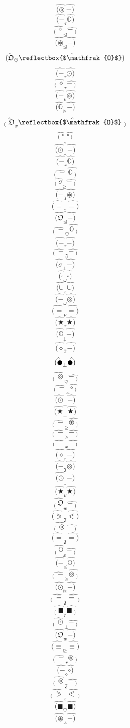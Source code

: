 \documentclass[12pt]{article}
\begin{document}
\begin{multicols}{5}
$$\hat{(\circledcirc} \  \hat{-)}$$
$$\hat{(-} _\tau \hat{\mathbb{O})}$$
$$\hat{_( \ \diamond} _\trianglelefteq \hat{-\ _)}$$
$$\hat{(\circledast} _\trianglelefteq \hat{-)}$$
$$\hat{(\mathfrak{O}} _\heartsuit \hat{\reflectbox{$\mathfrak{O}$})}$$
$$\hat{(-} _\tau \hat{\odot)}$$
$$\hat{_( \ \diamond} _\tau \hat{-\ _)}$$
$$\hat{(-} _\nu \hat{\circledcirc)}$$
$$\hat{(\mathbb{O}} _\trianglerighteq \hat{-)}$$
$$\hat{_( \ \mathfrak{O}} _x \hat{\reflectbox{$\mathfrak{O}$}\ _)}$$
$$\hat{_( \ \square} _\downarrow \hat{\square\ _)}$$
$$\hat{(\odot} _\curlywedge \hat{-)}$$
$$\hat{(-} _r \hat{\mathbb{O})}$$
$$\hat{_( \ -} \  \hat{\mathbb{O}\ _)}$$
$$\hat{_( \ \sigma} _\trianglerighteq \hat{-\ _)}$$
$$\hat{(-} _\mathfrak{I} \hat{\circledast)}$$
$$\hat{(=} _x \hat{=)}$$
$$\hat{(\mathfrak{O}} _\trianglelefteq \hat{-)}$$
$$\hat{_( \ -} _\heartsuit \hat{\mathbb{O}\ _)}$$
$$\hat{(-} _\tau \hat{-)}$$
$$\hat{_( \ -} _\mathfrak{J} \hat{-\ _)}$$
$$\hat{(\sigma} _\bot \hat{-)}$$
$$\hat{(\square} _\omega \hat{\square)}$$
$$\hat{(\cup} _x \hat{\cup)}$$
$$\hat{(-} _\omega \hat{\circledcirc)}$$
$$\hat{(=} _\nu \hat{=)}$$
$$\hat{(\bigstar} _\tau \hat{\bigstar)}$$
$$\hat{(\mathbb{O}} _\downarrow \hat{-)}$$
$$\hat{(\diamond} _\mathfrak{I} \hat{-)}$$
$$\hat{(\newmoon} _\bot \hat{\newmoon)}$$
$$\hat{_( \ \circledcirc} _\heartsuit \hat{-\ _)}$$
$$\hat{_( \ -} _\curlywedge \hat{\circ\ _)}$$
$$\hat{(\odot} _\bot \hat{-)}$$
$$\hat{(\bigstar} _\bot \hat{\bigstar)}$$
$$\hat{_( \ -} _\trianglerighteq \hat{\circledast\ _)}$$
$$\hat{_( \ -} _\trianglerighteq \hat{-\ _)}$$
$$\hat{_( \ -} _x \hat{-\ _)}$$
$$\hat{(\diamond} _r \hat{-)}$$
$$\hat{(-} _\mathfrak{I} \hat{\circledcirc)}$$
$$\hat{(\odot} _\downarrow \hat{-)}$$
$$\hat{(\bigstar} _\nu \hat{\bigstar)}$$
$$\hat{_( \ \mathfrak{O}} _w \hat{-\ _)}$$
$$\hat{(\eqslantgtr} _\mathfrak{I} \hat{\eqslantless)}$$
$$\hat{_( \ \circledcirc} \  \hat{-\ _)}$$
$$\hat{(=} _\mathfrak{J} \hat{=)}$$
$$\hat{_( \ \mathbb{O}} _x \hat{-\ _)}$$
$$\hat{(-} _\trianglelefteq \hat{\mathbb{O})}$$
$$\hat{_( \ -} _\trianglerighteq \hat{\circledcirc\ _)}$$
$$\hat{(\odot} _\trianglerighteq \hat{-)}$$
$$\hat{_( \ \equiv} _\mathfrak{J} \hat{\equiv\ _)}$$
$$\hat{_( \ \blacksquare} _r \hat{\blacksquare\ _)}$$
$$\hat{_( \ \odot} _\bot \hat{-\ _)}$$
$$\hat{(\mathfrak{O}} _w \hat{-)}$$
$$\hat{(\equiv} _\trianglerighteq \hat{\equiv)}$$
$$\hat{_( \ -} _r \hat{\circledast\ _)}$$
$$\hat{(-} _\diamond \hat{\circ)}$$
$$\hat{_( \ \circledast} _\mathfrak{J} \hat{-\ _)}$$
$$\hat{_( \ \eqslantgtr} _x \hat{\eqslantless\ _)}$$
$$\hat{(\blacksquare} _\heartsuit \hat{\blacksquare)}$$
$$\hat{(\circledast} _\curlywedge \hat{-)}$$

\end{multicols}
\end{document}
